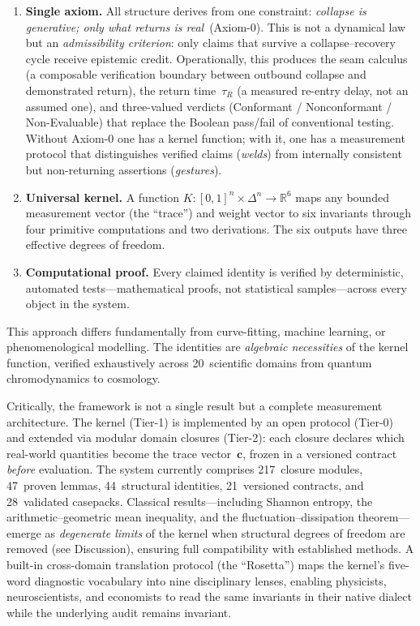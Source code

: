\documentclass[
  aps,
  prx,
  twocolumn,
  superscriptaddress,
  nofootinbib,
  floatfix
]{revtex4-2}
\newcommand{\tR}{\tau_{\!R}}
\newcommand{\tvec}{\mathbf{c}}
\begin{document}
\begin{enumerate}[leftmargin=2em,itemsep=2pt]
\item \textbf{Single axiom.} All structure derives from one
  constraint: \emph{collapse is generative; only what returns is
  real}~(Axiom-0). This is not a dynamical law but an
  \emph{admissibility criterion}: only claims that survive a
  collapse--recovery cycle receive epistemic credit. Operationally,
  this produces the seam calculus (a composable verification
  boundary between outbound collapse and demonstrated return), the
  return time~$\tR$ (a measured re-entry delay, not an assumed one),
  and three-valued verdicts (Conformant / Nonconformant /
  Non-Evaluable) that replace the Boolean pass/fail of conventional
  testing. Without Axiom-0 one has a kernel function; with it, one
  has a measurement protocol that distinguishes verified claims
  (\emph{welds}) from internally consistent but non-returning
  assertions (\emph{gestures}).
\item \textbf{Universal kernel.} A function
  $K\!:\![0,1]^n \times \Delta^n \to \mathbb{R}^6$ maps any bounded
  measurement vector (the ``trace'') and weight vector to six
  invariants through four primitive computations and two derivations.
  The six outputs have three effective degrees of freedom.
\item \textbf{Computational proof.} Every claimed identity is verified
  by deterministic, automated tests---mathematical proofs, not
  statistical samples---across every object in the system.
\end{enumerate}

This approach differs fundamentally from curve-fitting, machine
learning, or phenomenological modelling. The identities are
\emph{algebraic necessities} of the kernel function, verified
exhaustively across 20~scientific domains from quantum
chromodynamics to cosmology.

Critically, the framework is not a single result but a complete
measurement architecture. The kernel (Tier-1) is implemented by
an open protocol (Tier-0) and extended via modular domain
closures (Tier-2): each closure declares which real-world
quantities become the trace vector~$\tvec$, frozen in a versioned
contract \emph{before} evaluation. The system currently comprises
217~closure modules, 47~proven lemmas, 44~structural identities,
21~versioned contracts, and 28~validated casepacks. Classical
results---including Shannon entropy, the arithmetic--geometric
mean inequality, and the fluctuation--dissipation
theorem---emerge as \emph{degenerate limits} of the kernel when
structural degrees of freedom are removed (see Discussion),
ensuring full compatibility with established methods. A built-in
cross-domain translation protocol (the ``Rosetta'') maps the
kernel's five-word diagnostic vocabulary into nine disciplinary
lenses, enabling physicists, neuroscientists, and economists to
read the same invariants in their native dialect while the
underlying audit remains invariant.
\end{document}
